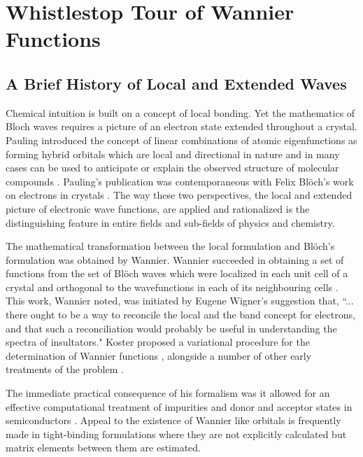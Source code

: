 \chapter{Whistlestop Tour of Wannier Functions}
\label{chap:wannier}
\section{A Brief History of Local and Extended Waves}
Chemical intuition is built on a concept of local bonding. 
Yet the mathematics of Bloch waves requires a picture of an 
electron state extended throughout a crystal.
Pauling introduced the concept of linear combinations of atomic eigenfunctions
as forming hybrid orbitals which are local and directional in nature and
in many cases can be used to anticipate or explain the observed structure
of molecular compounds \cite{pauling28}. Pauling's publication was contemporaneous
with Felix Bl\"och's work on electrons in crystals \cite{bloch28}. The
way these two perspectives, the local and extended picture of electronic wave functions, 
are applied and rationalized is the distinguishing feature 
in entire fields and sub-fields of physics and chemistry.

The mathematical transformation between the local formulation
and Bl\"och's formulation was obtained by Wannier. 
Wannier succeeded in obtaining a set of functions
from the set of Bl\"och waves which were localized in each unit cell
of a crystal and orthogonal to the wavefunctions in each of its
neighbouring cells \cite{wannier37, wannier62}. 
This work, Wannier noted, was initiated by Eugene Wigner's suggestion that, 
``... there ought to be a way to reconcile the local and the band concept 
for electrons, and that such a reconciliation would probably be useful in 
understanding the spectra of insultators." Koster proposed a variational
procedure for the determination of Wannier functions \cite{koster53},
alongside a number of other early treatments of the problem \cite{winston54}.

The immediate practical consequence of his formalism was
it allowed for an effective computational treatment of impurities 
and donor and acceptor states in semiconductors \cite{slater49,kittel54}.
Appeal to the existence of Wannier like orbitals is frequently made in
tight-binding formulations where they are not explicitly calculated but
matrix elements between them are estimated.


